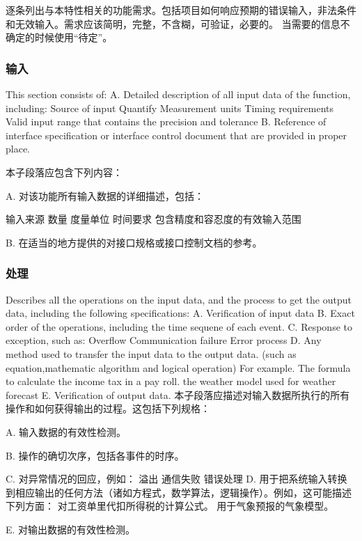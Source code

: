 逐条列出与本特性相关的功能需求。包括项目如何响应预期的错误输入，非法条件和无效输入。需求应该简明，完整，不含糊，可验证，必要的。 当需要的信息不确定的时候使用“待定”。
\subsubsection{输入}
This section consists of:
A. Detailed description of all input data of the function, including:
Source of input
Quantify
Measurement units
Timing requirements
Valid input range that contains the precision and tolerance
B. Reference of interface specification or interface control document that are provided in proper place.

本子段落应包含下列内容：

A. 对该功能所有输入数据的详细描述，包括：

		输入来源
		数量
		度量单位
		时间要求
		包含精度和容忍度的有效输入范围
		
B. 在适当的地方提供的对接口规格或接口控制文档的参考。
\subsubsection{处理}
Describes all the operations on the input data, and the process to get the output data, including the following specifications:
A. Verification of input data
B. Exact order of the operations, including the time sequene of each event.
C. Response to exception, such as:
		 Overflow
		Communication failure
		Error process
D. Any method used to transfer the input data to the output data. (such as equation,mathematic algorithm and logical operation)
For example.
		The formula to calculate the income tax in a pay roll.
		the weather model used for weather forecast
E. Verification of output data.
本子段落应描述对输入数据所执行的所有操作和如何获得输出的过程。这包括下列规格：

A. 输入数据的有效性检测。

B. 操作的确切次序，包括各事件的时序。

C. 对异常情况的回应，例如：
		溢出
		通信失败
		错误处理
D. 用于把系统输入转换到相应输出的任何方法（诸如方程式，数学算法，逻辑操作）。例如，这可能描述下列方面：
		对工资单里代扣所得税的计算公式。
		用于气象预报的气象模型。
		
E.	对输出数据的有效性检测。
